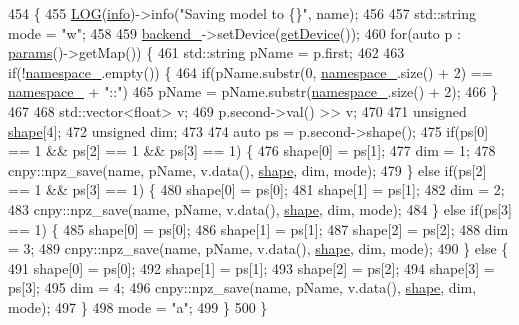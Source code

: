 \begin{DoxyCode}
454                                    \{
455     \hyperlink{amun_2common_2logging_8h_a8cad147aca8c526d3c8a03ae14d5c87d}{LOG}(\hyperlink{namespacefix__hard_a31eedbb056537bc1bef47ad5e40eaa68}{info})->info(\textcolor{stringliteral}{"Saving model to \{\}"}, name);
456 
457     std::string mode = \textcolor{stringliteral}{"w"};
458 
459     \hyperlink{classmarian_1_1ExpressionGraph_a0f7e6ae1853ea83f5adc80fe3f5b2cb7}{backend\_}->setDevice(\hyperlink{classmarian_1_1ExpressionGraph_a6de2782630380b0b2d3a1ded6db5324d}{getDevice}());
460     \textcolor{keywordflow}{for}(\textcolor{keyword}{auto} p : \hyperlink{classmarian_1_1ExpressionGraph_a01122decdd8ff42c1c4ed519fd0222c9}{params}()->getMap()) \{
461       std::string pName = p.first;
462 
463       \textcolor{keywordflow}{if}(!\hyperlink{classmarian_1_1ExpressionGraph_a62c31bfad16a2939bced2f37b45dd8d7}{namespace\_}.empty()) \{
464         \textcolor{keywordflow}{if}(pName.substr(0, \hyperlink{classmarian_1_1ExpressionGraph_a62c31bfad16a2939bced2f37b45dd8d7}{namespace\_}.size() + 2) == \hyperlink{classmarian_1_1ExpressionGraph_a62c31bfad16a2939bced2f37b45dd8d7}{namespace\_} + \textcolor{stringliteral}{"::"})
465           pName = pName.substr(\hyperlink{classmarian_1_1ExpressionGraph_a62c31bfad16a2939bced2f37b45dd8d7}{namespace\_}.size() + 2);
466       \}
467 
468       std::vector<float> v;
469       p.second->val() >> v;
470 
471       \textcolor{keywordtype}{unsigned} \hyperlink{namespacemarian_1_1keywords_a5933d683efd12b59e17a7131fa64cf1c}{shape}[4];
472       \textcolor{keywordtype}{unsigned} dim;
473 
474       \textcolor{keyword}{auto} ps = p.second->shape();
475       \textcolor{keywordflow}{if}(ps[0] == 1 && ps[2] == 1 && ps[3] == 1) \{
476         shape[0] = ps[1];
477         dim = 1;
478         cnpy::npz\_save(name, pName, v.data(), \hyperlink{namespacemarian_1_1keywords_a5933d683efd12b59e17a7131fa64cf1c}{shape}, dim, mode);
479       \} \textcolor{keywordflow}{else} \textcolor{keywordflow}{if}(ps[2] == 1 && ps[3] == 1) \{
480         shape[0] = ps[0];
481         shape[1] = ps[1];
482         dim = 2;
483         cnpy::npz\_save(name, pName, v.data(), \hyperlink{namespacemarian_1_1keywords_a5933d683efd12b59e17a7131fa64cf1c}{shape}, dim, mode);
484       \} \textcolor{keywordflow}{else} \textcolor{keywordflow}{if}(ps[3] == 1) \{
485         shape[0] = ps[0];
486         shape[1] = ps[1];
487         shape[2] = ps[2];
488         dim = 3;
489         cnpy::npz\_save(name, pName, v.data(), \hyperlink{namespacemarian_1_1keywords_a5933d683efd12b59e17a7131fa64cf1c}{shape}, dim, mode);
490       \} \textcolor{keywordflow}{else} \{
491         shape[0] = ps[0];
492         shape[1] = ps[1];
493         shape[2] = ps[2];
494         shape[3] = ps[3];
495         dim = 4;
496         cnpy::npz\_save(name, pName, v.data(), \hyperlink{namespacemarian_1_1keywords_a5933d683efd12b59e17a7131fa64cf1c}{shape}, dim, mode);
497       \}
498       mode = \textcolor{stringliteral}{"a"};
499     \}
500   \}
\end{DoxyCode}


